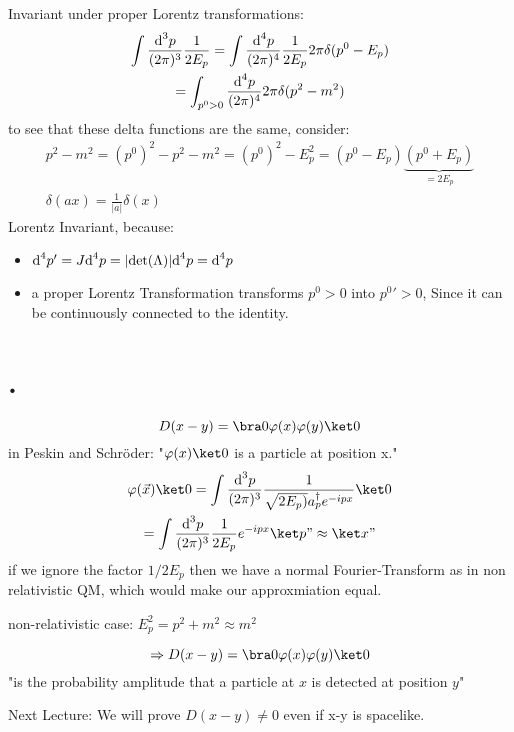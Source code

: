 \documentclass[]{scrartcl}
\begin{document}
Invariant under proper Lorentz transformations:
\begin{gather}
	\int \frac{\text d^3p}{(2\pi)^3}\frac{1}{2E_p} = \int \frac{\text d^4p}{(2\pi)^4}\frac{1}{2E_p} 2\pi \delta(p^0 - E_p)\\
	=\int_{p^0 > 0} \frac{\text d^4p}{(2\pi)^4}2\pi\delta(p^2 - m^2) %
\end{gather}
to see that these delta functions are the same, consider:
\begin{gather}
	p^2 - m^2 = (p^0)^2 - p^2 - m^2 = (p^0)^2 - E_p^2 = (p^0 - E_p)\underbrace{(p^0 + E_p)}_{=2E_p}\\
	\delta(ax) = \frac{1}{|a|}\delta(x)
\end{gather}
Lorentz Invariant, because:
\begin{itemize}
	\item $\text d ^4p' = J \text d^4p = |\text{det}(\Lambda)|\text d ^4p = \text d ^4p$
	\item a proper Lorentz Transformation transforms $p^0 > 0$ into $p^0' > 0$, Since it can be continuously connected to the identity.
\end{itemize}

\section{.}
\begin{equation}
	D(x-y) = \bra 0 \varphi(x)\varphi(y) \ket 0
\end{equation}
in Peskin and Schröder: "$\varphi(x)\ket0$ is a particle at position x."
\begin{gather}
	\varphi(\vec x)\ket0 = \int \frac{\text d^3p}{(2\pi)^3}\frac{1}{\sqrt{2E_p)}a_p^\dagger e^{-ipx}}\ket 0\\
	= \int \frac{\text d^3p}{(2\pi)^3}\frac{1}{2E_p}e^{-ipx}\ket p "\approx \ket x"
\end{gather}
if we ignore the factor $1/2E_p$ then we have a normal Fourier-Transform as in non relativistic QM, which would make our approxmiation equal.

non-relativistic case: $E_p^2 = p^2 + m^2 \approx m^2$

\begin{equation}
	\Rightarrow D(x-y) = \bra 0 \varphi(x)\varphi(y) \ket0
\end{equation}
"is the probability amplitude that a particle at $x$ is detected at position $y$"

Next Lecture: We will prove $D(x-y) \neq 0$ even if x-y is spacelike.
\end{document}
